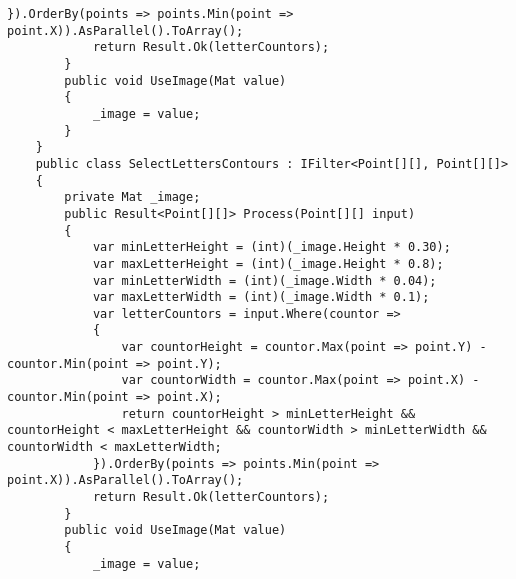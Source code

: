 \begin{lstlisting}[style=fsharpstyle,caption={Исходный код}, label=lst:recognition_result_handler]
            }).OrderBy(points => points.Min(point => point.X)).AsParallel().ToArray();
            return Result.Ok(letterCountors);
        }
        public void UseImage(Mat value)
        {
            _image = value;
        }
    }
    public class SelectLettersContours : IFilter<Point[][], Point[][]>
    {
        private Mat _image;
        public Result<Point[][]> Process(Point[][] input)
        {
            var minLetterHeight = (int)(_image.Height * 0.30);
            var maxLetterHeight = (int)(_image.Height * 0.8);
            var minLetterWidth = (int)(_image.Width * 0.04);
            var maxLetterWidth = (int)(_image.Width * 0.1);
            var letterCountors = input.Where(countor =>
            {
                var countorHeight = countor.Max(point => point.Y) - countor.Min(point => point.Y);
                var countorWidth = countor.Max(point => point.X) - countor.Min(point => point.X);
                return countorHeight > minLetterHeight && countorHeight < maxLetterHeight && countorWidth > minLetterWidth && countorWidth < maxLetterWidth;
            }).OrderBy(points => points.Min(point => point.X)).AsParallel().ToArray();
            return Result.Ok(letterCountors);
        }
        public void UseImage(Mat value)
        {
            _image = value;    
\end{lstlisting}